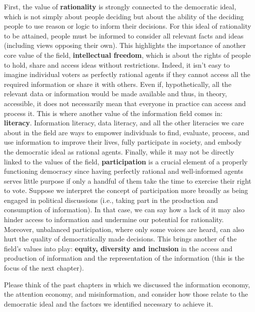 \documentclass[
  letterpaper,
  DIV=11,
  numbers=noendperiod]{scrreprt}
\begin{document}
First, the value of \textbf{rationality} is strongly connected to the
democratic ideal, which is not simply about people deciding but about
the ability of the deciding people to use reason or logic to inform
their decisions. For this ideal of rationality to be attained, people
must be informed to consider all relevant facts and ideas (including
views opposing their own). This highlights the importance of another
core value of the field, \textbf{intellectual freedom}, which is about
the rights of people to hold, share and access ideas without
restrictions. Indeed, it isn't easy to imagine individual voters as
perfectly rational agents if they cannot access all the required
information or share it with others. Even if, hypothetically, all the
relevant data or information would be made available and thus, in
theory, accessible, it does not necessarily mean that everyone in
practice can access and process it. This is where another value of the
information field comes in: \textbf{literacy}. Information literacy,
data literacy, and all the other literacies we care about in the field
are ways to empower individuals to find, evaluate, process, and use
information to improve their lives, fully participate in society, and
embody the democratic ideal as rational agents. Finally, while it may
not be directly linked to the values of the field,
\textbf{participation} is a crucial element of a properly functioning
democracy since having perfectly rational and well-informed agents
serves little purpose if only a handful of them take the time to
exercise their right to vote. Suppose we interpret the concept of
participation more broadly as being engaged in political discussions
(i.e., taking part in the production and consumption of information). In
that case, we can say how a lack of it may also hinder access to
information and undermine our potential for rationality. Moreover,
unbalanced participation, where only some voices are heard, can also
hurt the quality of democratically made decisions. This brings another
of the field's values into play: \textbf{equity, diversity and
inclusion} in the access and production of information and the
representation of the information (this is the focus of the next
chapter).

\begin{tcolorbox}[enhanced jigsaw, arc=.35mm, bottomrule=.15mm, bottomtitle=1mm, breakable, colback=white, colbacktitle=quarto-callout-tip-color!10!white, colframe=quarto-callout-tip-color-frame, coltitle=black, left=2mm, leftrule=.75mm, opacityback=0, opacitybacktitle=0.6, rightrule=.15mm, title=\textcolor{quarto-callout-tip-color}{\faLightbulb}\hspace{0.5em}{Stop and reflect}, titlerule=0mm, toprule=.15mm, toptitle=1mm]

Please think of the past chapters in which we discussed the information
economy, the attention economy, and misinformation, and consider how
those relate to the democratic ideal and the factors we identified
necessary to achieve it.

\end{tcolorbox}
\end{document}
